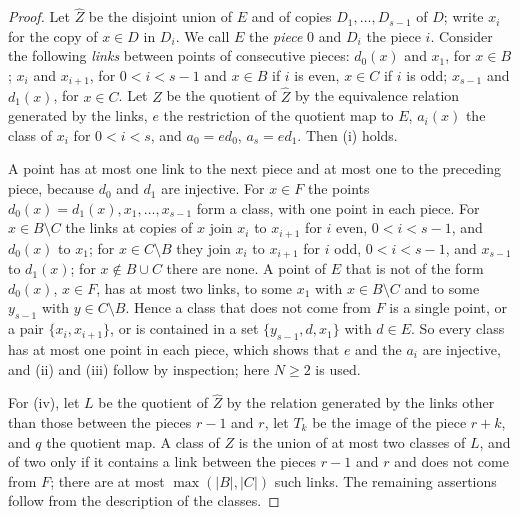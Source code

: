 \begin{proof}
Let $\widehat Z$ be the disjoint union of $E$ and of copies $D_1,\dots,D_{s-1}$
of $D$; write $x_i$ for the copy of $x\in D$ in $D_i$. We call $E$ the
\emph{piece} $0$ and $D_i$ the piece $i$. Consider the following \emph{links}
between points of consecutive pieces: $d_0(x)$ and $x_1$, for $x\in B$; $x_i$
and $x_{i+1}$, for $0<i<s-1$ and $x\in B$ if $i$ is even, $x\in C$ if $i$ is
odd; $x_{s-1}$ and $d_1(x)$, for $x\in C$. Let $Z$ be the quotient of
$\widehat Z$ by the equivalence relation generated by the links, $e$ the
restriction of the quotient map to $E$, $a_i(x)$ the class of $x_i$ for
$0<i<s$, and $a_0=ed_0$, $a_s=ed_1$. Then (i) holds.

A point has at most one link to the next piece and at most one to the
preceding piece, because $d_0$ and $d_1$ are injective. For $x\in F$ the
points $d_0(x)=d_1(x),x_1,\dots,x_{s-1}$ form a class, with one point in each
piece. For $x\in B\setminus C$ the links at copies of $x$ join $x_i$ to
$x_{i+1}$ for $i$ even, $0<i<s-1$, and $d_0(x)$ to $x_1$; for
$x\in C\setminus B$ they join $x_i$ to $x_{i+1}$ for $i$ odd, $0<i<s-1$, and
$x_{s-1}$ to $d_1(x)$; for $x\notin B\cup C$ there are none. A point of $E$ that
is not of the form $d_0(x)$, $x\in F$, has at most two links, to some $x_1$
with $x\in B\setminus C$ and to some $y_{s-1}$ with $y\in C\setminus B$. Hence a
class that does not come from $F$ is a single point, or a pair
$\{x_i,x_{i+1}\}$, or is contained in a set $\{y_{s-1},d,x_1\}$ with $d\in E$.
So every class has at most one point in each piece, which shows that $e$ and
the $a_i$ are injective, and (ii) and (iii) follow by inspection; here
$N\ge 2$ is used.

For (iv), let $L$ be the quotient of $\widehat Z$ by the relation generated
by the links other than those between the pieces $r-1$ and $r$, let $T_k$ be
the image of the piece $r+k$, and $q$ the quotient map. A class of $Z$ is the
union of at most two classes of $L$, and of two only if it contains a link
between the pieces $r-1$ and $r$ and does not come from $F$; there are at
most $\max(|B|,|C|)$ such links. The remaining assertions follow from the
description of the classes.


\end{proof}
